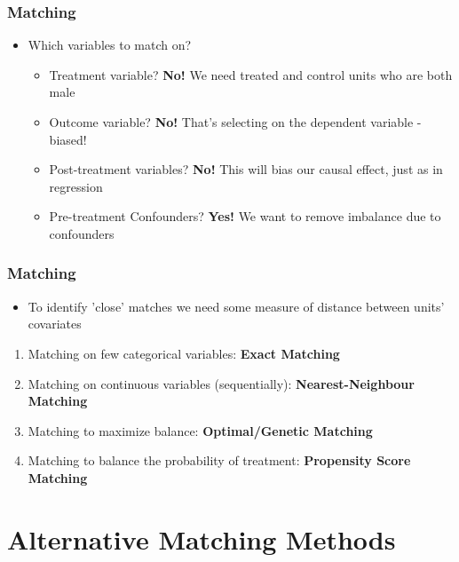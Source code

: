 \documentclass[xcolor=x11names,compress]{beamer}\usepackage[]{graphicx}\usepackage[]{color}
\renewcommand{\(}{\begin{columns}}
\renewcommand{\)}{\end{columns}}
\newcommand{\<}[1]{\begin{column}{#1}}
\renewcommand{\>}{\end{column}}
\begin{document}
\begin{frame}
\frametitle{Matching}
\begin{itemize}
\item Which variables to match on?
\pause
\begin{itemize}
\item Treatment variable? \pause \textbf{No!} We need treated and control units who are both male
\pause
\item Outcome variable? \pause \textbf{No!} That's selecting on the dependent variable - biased!
\pause
\item Post-treatment variables? \pause \textbf{No!} This will bias our causal effect, just as in regression
\pause
\item Pre-treatment Confounders? \pause \textbf{Yes!} We want to remove imbalance due to confounders 
\end{itemize}
\end{itemize}
\end{frame}



\begin{frame}
\frametitle{Matching}
\begin{itemize}
\item To identify 'close' matches we need some measure of distance between units' covariates
\pause
\end{itemize}
\begin{enumerate}
\item Matching on few categorical variables: \textbf{Exact Matching}
\pause
\item Matching on continuous variables (sequentially): \textbf{Nearest-Neighbour Matching}
\pause
\item Matching to maximize balance: \textbf{Optimal/Genetic Matching}
\pause
\item Matching to balance the probability of treatment: \textbf{Propensity Score Matching}
\end{enumerate}
\end{frame}

\section{Alternative Matching Methods}
\end{document}
